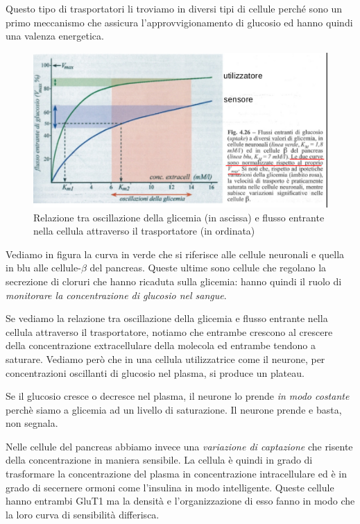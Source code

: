 \documentclass[a4paper,12pt]{article}
\begin{document}
Questo tipo di trasportatori li troviamo in diversi tipi di cellule perché sono un primo meccanismo che assicura l’approvvigionamento di glucosio ed hanno quindi una valenza energetica.
\begin{figure}[H]
\centering
\includegraphics[scale=0.3]{immagine/sensore.jpg}
\caption{Relazione tra oscillazione della glicemia (in ascissa) e flusso entrante nella cellula attraverso il trasportatore (in ordinata)}
\end{figure}
Vediamo in figura la curva in
verde che si riferisce alle cellule neuronali e quella in blu alle
cellule-$\beta$ del pancreas. Queste ultime sono cellule che regolano la secrezione di cloruri
che hanno ricaduta sulla glicemia: hanno quindi il ruolo di
\emph{monitorare la concentrazione
di glucosio nel sangue}.

Se vediamo la relazione tra oscillazione della glicemia e flusso entrante nella cellula attraverso il trasportatore,  notiamo che entrambe crescono al crescere della concentrazione extracellulare della molecola ed
entrambe tendono a saturare. Vediamo però che in una cellula utilizzatrice come il neurone, per concentrazioni oscillanti di glucosio nel plasma, si produce un plateau.

Se il glucosio
cresce o decresce nel plasma, il neurone lo prende \emph{in modo costante} perchè siamo a glicemia ad un livello di saturazione. Il neurone prende e basta, non segnala.

Nelle cellule del pancreas abbiamo invece una \emph{variazione di
captazione} che risente della concentrazione in maniera sensibile. La cellula è quindi in grado di trasformare la concentrazione del plasma in concentrazione intracellulare ed è in
grado di secernere ormoni come l’insulina in modo intelligente. Queste cellule hanno entrambi GluT1 ma la densità e l’organizzazione di esso fanno in modo che la loro curva di
sensibilità differisca.
\end{document}
